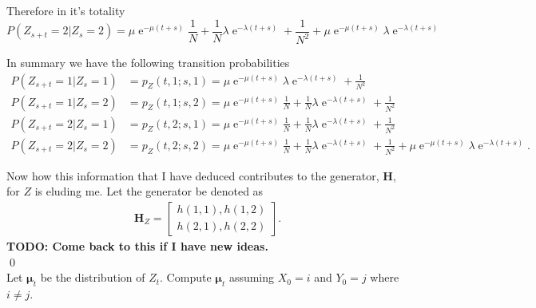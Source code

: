 \documentclass[10pt]{amsart}
\DeclareMathOperator{\E}{e}
\begin{document}
Therefore in it's totality
$$
P(Z_{s + t} = 2 | Z_s = 2) =  \mu\E^{-\mu(t + s)}  \frac 1 N + \frac 1 N  \lambda\E^{-\lambda(t + s)}  + \frac 1 {N^2} +  \mu\E^{-\mu(t + s)} \lambda\E^{-\lambda(t + s)} 
$$

\noindent
In summary we have the following transition probabilities
\begin{align*}
P(Z_{s + t} = 1 | Z_s = 1) &= p_Z(t,1;s,1) = \mu\E^{-\mu(t + s)} \lambda\E^{-\lambda(t + s)} + \frac 1 {N^2} \\
P(Z_{s + t} = 1 | Z_s = 2) &= p_Z(t,1;s,2) = \mu\E^{-\mu(t + s)} \frac 1 N + \frac 1 N \lambda\E^{-\lambda(t + s)} + \frac 1 {N^2} \\
P(Z_{s + t} = 2 | Z_s = 1) &= p_Z(t,2;s,1) = \mu\E^{-\mu(t + s)} \frac 1 N + \frac 1 N \lambda\E^{-\lambda(t + s)} + \frac 1 {N^2} \\
P(Z_{s + t} = 2 | Z_s = 2) &= p_Z(t,2;s,2) = \mu\E^{-\mu(t + s)} \frac 1 N + \frac 1 N \lambda\E^{-\lambda(t + s)} + \frac 1 {N^2} + \mu\E^{-\mu(t + s)} \lambda\E^{-\lambda(t + s)}.
\end{align*}

\noindent
Now how this information that I have deduced contributes to the generator, $\bm H$, for $Z$ is eluding me.
Let the generator be denoted as
\begin{align*}
\bm H_Z = 
\begin{bmatrix}
h(1,1), h(1,2) \\
h(2,1), h(2,2)
\end{bmatrix}.
\end{align*}
\textbf{TODO: Come back to this if I have new ideas.} \\
\qed \\


 Let ${\bm \mu}_t$ be the distribution of $Z_t$. Compute  ${\bm \mu}_t$ assuming $X_0=i$ and $Y_0=j$ where $i\neq j$. \\
\end{document}
